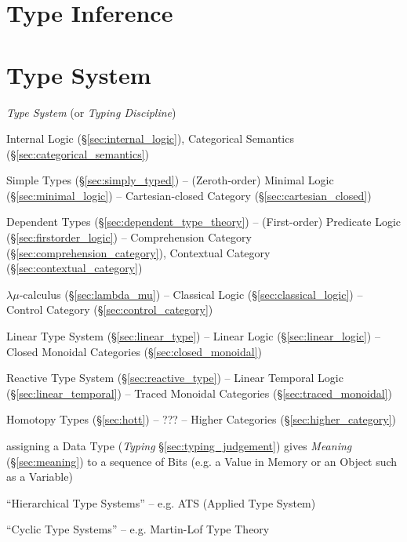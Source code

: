 \section{Type Inference}\label{sec:type_inference}

\section{Type System}\label{sec:type_system}

\emph{Type System} (or \emph{Typing Discipline})

Internal Logic (\S\ref{sec:internal_logic}), Categorical Semantics
(\S\ref{sec:categorical_semantics})

Simple Types (\S\ref{sec:simply_typed}) -- (Zeroth-order) Minimal
Logic (\S\ref{sec:minimal_logic}) -- Cartesian-closed Category
(\S\ref{sec:cartesian_closed})

Dependent Types (\S\ref{sec:dependent_type_theory}) -- (First-order)
Predicate Logic (\S\ref{sec:firstorder_logic}) -- Comprehension
Category (\S\ref{sec:comprehension_category}), Contextual Category
(\S\ref{sec:contextual_category})

$\lambda\mu$-calculus (\S\ref{sec:lambda_mu}) -- Classical Logic
(\S\ref{sec:classical_logic}) -- Control Category
(\S\ref{sec:control_category})

Linear Type System (\S\ref{sec:linear_type}) -- Linear Logic
(\S\ref{sec:linear_logic}) -- Closed Monoidal Categories
(\S\ref{sec:closed_monoidal})

Reactive Type System (\S\ref{sec:reactive_type}) -- Linear Temporal
Logic (\S\ref{sec:linear_temporal}) -- Traced Monoidal Categories
(\S\ref{sec:traced_monoidal})

Homotopy Types (\S\ref{sec:hott}) -- ??? -- Higher Categories
(\S\ref{sec:higher_category})

assigning a Data Type (\emph{Typing} \S\ref{sec:typing_judgement})
gives \emph{Meaning} (\S\ref{sec:meaning}) to a sequence of Bits (e.g.
a Value in Memory or an Object such as a Variable)

``Hierarchical Type Systems'' -- e.g. ATS (Applied Type System)

``Cyclic Type Systems'' -- e.g. Martin-Lof Type Theory



